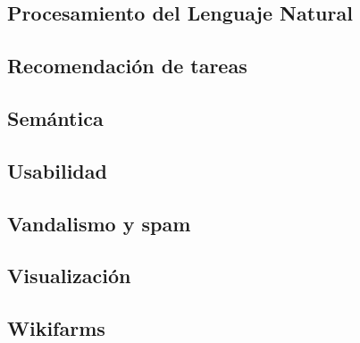 \documentclass[11pt,onecolumn]{article}
\begin{document}

\subsection{Procesamiento del Lenguaje Natural}


\subsection{Recomendación de tareas}



\subsection{Semántica}


\subsection{Usabilidad}



% 

\subsection{Vandalismo y spam}





 \citep{avbot2011}
 \citep{avbot2010}
 \citep{avbot2009}

\subsection{Visualización}




\subsection{Wikifarms}
\end{document}
